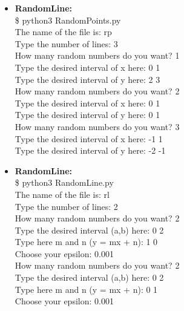 \documentclass{article}
\begin{document}
\begin{itemize}
        \item \textbf{RandomLine:}\\
        \$ python3 RandomPoints.py\\
        The name of the file is: rp\\
        Type the number of lines: 3\\
        How many random numbers do you want? 1\\
        Type the desired interval of x here: 0 1\\
        Type the desired interval of y here: 2 3\\
        How many random numbers do you want? 2\\
        Type the desired interval of x here: 0 1\\
        Type the desired interval of y here: 0 1\\
        How many random numbers do you want? 3\\
        Type the desired interval of x here: -1 1\\
        Type the desired interval of y here: -2 -1
        \item \textbf{RandomLine:}\\
            \$ python3 RandomLine.py\\
            The name of the file is: rl \\
            Type the number of lines: 2 \\
            How many random numbers do you want? 2 \\
            Type the desired interval (a,b) here: 0 2 \\
            Type here m and n (y = mx + n): 1 0 \\
            Choose your epsilon: 0.001 \\
            How many random numbers do you want? 2 \\
            Type the desired interval (a,b) here: 0 2 \\
            Type here m and n (y = mx + n): 0 1 \\
            Choose your epsilon: 0.001 \\


\end{itemize}
\end{document}
